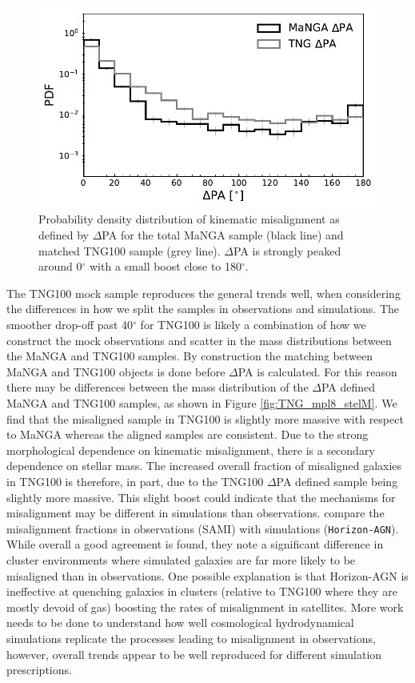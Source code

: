 \begin{figure}
    \centering
	\includegraphics[width=0.85\linewidth]{misalignment_TNG/mpl8_pa_dist.pdf}
    \caption{Probability density distribution of kinematic misalignment as defined by $\Delta$PA for the total MaNGA sample (black line) and matched TNG100 sample (grey line). $\Delta$PA is strongly peaked around 0$^{\circ}$ with a small boost close to 180$^{\circ}$.}
    \label{fig:total_pa_dist}
\end{figure}

The TNG100 mock sample reproduces the general trends well, when considering the differences in how we split the samples in observations and simulations. The smoother drop-off past 40$^{\circ}$ for TNG100 is likely a combination of how we construct the mock observations and scatter in the mass distributions between the MaNGA and TNG100 samples. By construction the matching between MaNGA and TNG100 objects is done before $\Delta$PA is calculated. For this reason there may be differences between the mass distribution of the $\Delta$PA defined MaNGA and TNG100 samples, as shown in Figure \ref{fig:TNG_mpl8_stelM}. We find that the misaligned sample in TNG100 is slightly more massive with respect to MaNGA whereas the aligned samples are consistent. Due to the strong morphological dependence on kinematic misalignment, there is a secondary dependence on stellar mass. The increased overall fraction of misaligned galaxies in TNG100 is therefore, in part, due to the TNG100 $\Delta$PA defined sample being slightly more massive. This slight boost could indicate that the mechanisms for misalignment may be different in simulations than observations. \citet{khim2019} compare the misalignment fractions in observations (SAMI) with simulations (\texttt{Horizon-AGN}). While overall a good agreement is found, they note a significant difference in cluster environments where simulated galaxies are far more likely to be misaligned than in observations. One possible explanation is that Horizon-AGN is ineffective at quenching galaxies in clusters (relative to TNG100 where they are mostly devoid of gas) boosting the rates of misalignment in satellites. More work needs to be done to understand how well cosmological hydrodynamical simulations replicate the processes leading to misalignment in observations, however, overall trends appear to be well reproduced for different simulation prescriptions.

